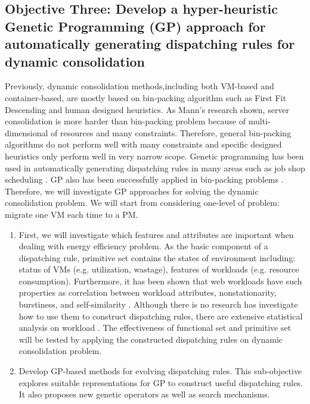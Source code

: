 \subsection{Objective Three: Develop a hyper-heuristic Genetic Programming (GP) approach for automatically generating dispatching rules for dynamic consolidation}

Previously, dynamic consolidation methods,including both VM-based and container-based, are mostly based on bin-packing algorithm such as First Fit Descending and human designed heuristics. As Mann's research \cite{Mann:2015ua} shown, server consolidation is more harder than bin-packing problem because of multi-dimensional of resources and many constraints. Therefore, general bin-packing algorithms do not perform well with many constraints and specific designed heuristics only perform well in very narrow scope. Genetic programming has been used in automatically generating dispatching rules in many areas such as job shop scheduling \cite{Nguyen:2014eu}. GP also has been successfully applied in bin-packing problems \cite{Burke:2006ei}. Therefore, we will investigate GP approaches for solving the dynamic consolidation problem. We will start from considering one-level of problem: migrate one VM each time to a PM. 


\begin{enumerate}
	\item First, we will investigate which features and attributes are important when dealing with energy efficiency problem. As the basic component of a dispatching rule, primitive set contains the states of environment including: status of VMs (e.g. utilization, wastage), features of workloads (e.g. resource consumption). Furthermore, it has been shown that web workloads have such properties as correlation between workload attributes, nonstationarity, burstiness, and self-similarity 
	\cite{Feitelson:2002kn}. Although there is no research has investigate how to use them to construct dispatching rules, there are extensive statistical analysis on workload \cite{Verma:2009wi}. The effectiveness of functional set and primitive set will be tested by applying the constructed dispatching rules on dynamic consolidation problem.

	\item Develop GP-based methods for evolving dispatching rules. This sub-objective explores suitable representations for GP to construct useful dispatching rules. It also proposes new genetic operators as well as search mechanisms. 
	\end{enumerate}

